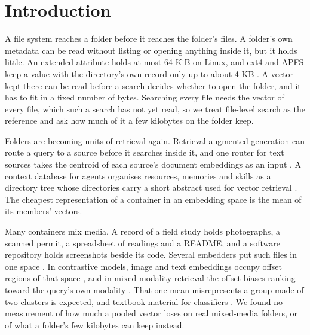 \documentclass[sigconf,natbib=true,anonymous=true]{acmart}
\begin{document}
\maketitle

\section{Introduction}
\label{sec:intro}

A file system reaches a folder before it reaches the folder's files. A folder's own metadata can be read without listing or opening anything inside it, but it holds little. An extended attribute holds at most 64 KiB on Linux, and ext4 and APFS keep a value with the directory's own record only up to about 4 KB \citep{linux2026xattr,e2fsprogs2025ext4,apple2020apfs}. A vector kept there can be read before a search decides whether to open the folder, and it has to fit in a fixed number of bytes. Searching every file needs the vector of every file, which such a search has not yet read, so we treat file-level search as the reference and ask how much of it a few kilobytes on the folder keep.

Folders are becoming units of retrieval again. Retrieval-augmented generation can route a query to a source before it searches inside it, and one router for text sources takes the centroid of each source's document embeddings as an input \citep{dhasade2026ragroute}. A context database for agents organises resources, memories and skills as a directory tree whose directories carry a short abstract used for vector retrieval \citep{openviking2026docs}. The cheapest representation of a container in an embedding space is the mean of its members' vectors.

Many containers mix media. A record of a field study holds photographs, a scanned permit, a spreadsheet of readings and a README, and a software repository holds screenshots beside its code. Several embedders put such files in one space \citep{gunther2025jinav4,koukounas2024jinaclipv2,zhang2025gme,nussbaum2024nomicvision}. In contrastive models, image and text embeddings occupy offset regions of that space \citep{liang2022mindgap}, and in mixed-modality retrieval the offset biases ranking toward the query's own modality \citep{li2025grclip}. That one mean misrepresents a group made of two clusters is expected, and textbook material for classifiers \citep{manning2008iir}. We found no measurement of how much a pooled vector loses on real mixed-media folders, or of what a folder's few kilobytes can keep instead.
\end{document}

